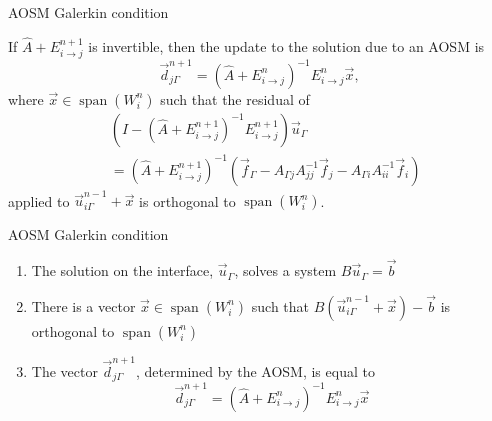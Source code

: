 \documentclass{beamer}
\newcommand{\Aij}{\left ( \hat{A} + E_{i \to j}^{n} \right )^{-1}}
\newcommand{\AijE}{\Aij E_{i \to j}^{n}}
\DeclareMathOperator{\Span}{span}
\begin{document}
\begin{frame}{AOSM Galerkin condition}

\begin{theorem} \label{thm: opt}
If $\hat{A} + E_{i \to j}^{n+1}$ is invertible, then the update to the solution due to an AOSM is $$\vec{d}_{j \Gamma}^{n+1} = \AijE \vec{x},$$ where
$\vec{x} \in  \Span(W_i^n)$ such that the residual of
\begin{align*}
	& \left ( I - \left ( \hat{A} + E_{i \to j}^{n+1} \right )^{-1} E_{i \to j}^{n+1} \right ) \vec{u}_\Gamma \\
	& = \left ( \hat{A} + E_{i \to j}^{n+1} \right )^{-1} \left ( \vec{f}_\Gamma - A_{\Gamma j} A_{jj}^{-1} \vec{f}_j - A_{\Gamma i} A_{ii}^{-1} \vec{f}_i \right )
\end{align*}
applied to $\vec{u}_{i \Gamma}^{n-1} + \vec{x}$ is orthogonal to $\Span(W_i^n)$. 
\end{theorem}
\end{frame}

\begin{frame}{AOSM Galerkin condition}

\begin{enumerate}
\item The solution on the interface, $\vec{u}_\Gamma$, solves a system $B \vec{u}_\Gamma = \vec{b}$
\item There is a vector $\vec{x} \in \Span(W_i^n)$ such that $B(\vec{u}_{i \Gamma}^{n-1} + \vec{x}) - \vec{b}$ is orthogonal to $\Span(W_i^n)$
\item The vector $\vec{d}_{j \Gamma}^{n+1}$, determined by the AOSM, is equal to $$\vec{d}_{j \Gamma}^{n+1} = \AijE \vec{x}$$
\end{enumerate}
\end{frame}
\end{document}
